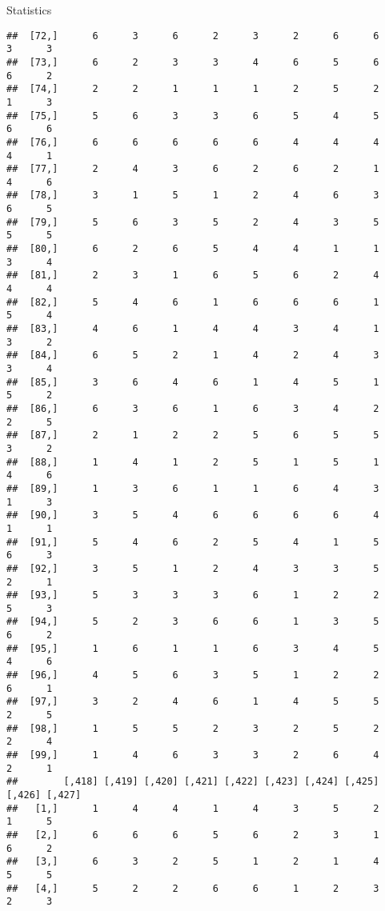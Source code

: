 \documentclass[
  ignorenonframetext,
]{beamer}
\begin{document}
\begin{frame}[fragile]{Statistics}
\begin{verbatim}
##  [72,]      6      3      6      2      3      2      6      6      3      3
##  [73,]      6      2      3      3      4      6      5      6      6      2
##  [74,]      2      2      1      1      1      2      5      2      1      3
##  [75,]      5      6      3      3      6      5      4      5      6      6
##  [76,]      6      6      6      6      6      4      4      4      4      1
##  [77,]      2      4      3      6      2      6      2      1      4      6
##  [78,]      3      1      5      1      2      4      6      3      6      5
##  [79,]      5      6      3      5      2      4      3      5      5      5
##  [80,]      6      2      6      5      4      4      1      1      3      4
##  [81,]      2      3      1      6      5      6      2      4      4      4
##  [82,]      5      4      6      1      6      6      6      1      5      4
##  [83,]      4      6      1      4      4      3      4      1      3      2
##  [84,]      6      5      2      1      4      2      4      3      3      4
##  [85,]      3      6      4      6      1      4      5      1      5      2
##  [86,]      6      3      6      1      6      3      4      2      2      5
##  [87,]      2      1      2      2      5      6      5      5      3      2
##  [88,]      1      4      1      2      5      1      5      1      4      6
##  [89,]      1      3      6      1      1      6      4      3      1      3
##  [90,]      3      5      4      6      6      6      6      4      1      1
##  [91,]      5      4      6      2      5      4      1      5      6      3
##  [92,]      3      5      1      2      4      3      3      5      2      1
##  [93,]      5      3      3      3      6      1      2      2      5      3
##  [94,]      5      2      3      6      6      1      3      5      6      2
##  [95,]      1      6      1      1      6      3      4      5      4      6
##  [96,]      4      5      6      3      5      1      2      2      6      1
##  [97,]      3      2      4      6      1      4      5      5      2      5
##  [98,]      1      5      5      2      3      2      5      2      2      4
##  [99,]      1      4      6      3      3      2      6      4      2      1
##        [,418] [,419] [,420] [,421] [,422] [,423] [,424] [,425] [,426] [,427]
##   [1,]      1      4      4      1      4      3      5      2      1      5
##   [2,]      6      6      6      5      6      2      3      1      6      2
##   [3,]      6      3      2      5      1      2      1      4      5      5
##   [4,]      5      2      2      6      6      1      2      3      2      3

\end{verbatim}
\end{frame}
\end{document}
